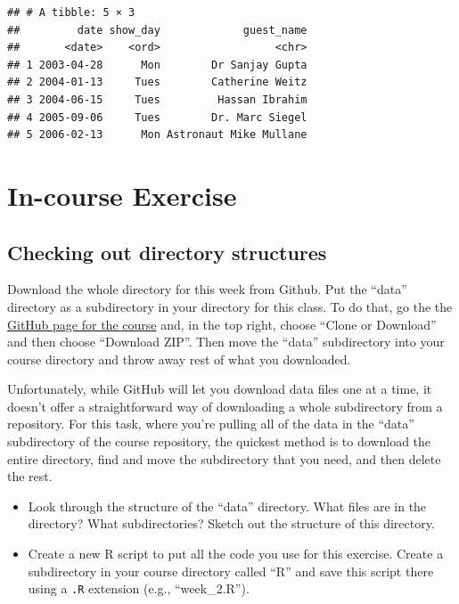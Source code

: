 \documentclass[]{book}
\makeatletter
\providecommand{\tightlist}{%
  \setlength{\itemsep}{0pt}\setlength{\parskip}{0pt}}
\newenvironment{kframe}{%
\medskip{}
\setlength{\fboxsep}{.8em}
 \def\at@end@of@kframe{}%
 \ifinner\ifhmode%
  \def\at@end@of@kframe{\end{minipage}}%
  \begin{minipage}{\columnwidth}%
 \fi\fi%
 \def\FrameCommand##1{\hskip\@totalleftmargin \hskip-\fboxsep
 \colorbox{shadecolor}{##1}\hskip-\fboxsep
     \hskip-\linewidth \hskip-\@totalleftmargin \hskip\columnwidth}%
 \MakeFramed {\advance\hsize-\width
   \@totalleftmargin\z@ \linewidth\hsize
   \@setminipage}}%
 {\par\unskip\endMakeFramed%
 \at@end@of@kframe}
\newenvironment{rmdblock}[1]
  {
  \begin{itemize}
  \renewcommand{\labelitemi}{
    \raisebox{-.7\height}[0pt][0pt]{
      {\setkeys{Gin}{width=3em,keepaspectratio}\texttt{[image: images/\#1]}}
    }
  }
  \setlength{\fboxsep}{1em}
  \begin{kframe}
  \item
  }
  {
  \end{kframe}
  \end{itemize}
  }
\newenvironment{rmdnote}
  {\begin{rmdblock}{note}}
  {\end{rmdblock}}
\makeatother
\begin{document}
\begin{verbatim}
## # A tibble: 5 × 3
##         date show_day             guest_name
##       <date>    <ord>                  <chr>
## 1 2003-04-28      Mon        Dr Sanjay Gupta
## 2 2004-01-13     Tues        Catherine Weitz
## 3 2004-06-15     Tues         Hassan Ibrahim
## 4 2005-09-06     Tues        Dr. Marc Siegel
## 5 2006-02-13      Mon Astronaut Mike Mullane
\end{verbatim}

\section{In-course Exercise}\label{in-course-exercise-1}

\subsection{Checking out directory
structures}\label{checking-out-directory-structures}

Download the whole directory for this week from Github. Put the ``data''
directory as a subdirectory in your directory for this class. To do
that, go the the
\href{https://github.com/geanders/RProgrammingForResearch}{GitHub page
for the course} and, in the top right, choose ``Clone or Download'' and
then choose ``Download ZIP''. Then move the ``data'' subdirectory into
your course directory and throw away rest of what you downloaded.

\begin{rmdnote}
Unfortunately, while GitHub will let you download data files one at a
time, it doesn't offer a straightforward way of downloading a whole
subdirectory from a repository. For this task, where you're pulling all
of the data in the ``data'' subdirectory of the course repository, the
quickest method is to download the entire directory, find and move the
subdirectory that you need, and then delete the rest.
\end{rmdnote}

\begin{itemize}
\tightlist
\item
  Look through the structure of the ``data'' directory. What files are
  in the directory? What subdirectories? Sketch out the structure of
  this directory.
\item
  Create a new R script to put all the code you use for this exercise.
  Create a subdirectory in your course directory called ``R'' and save
  this script there using a \texttt{.R} extension (e.g., ``week\_2.R'').
\end{itemize}
\end{document}
